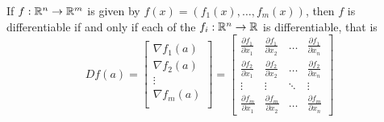 \documentclass[11pt]{article}
\begin{document}
\begin{proposition}
  \label{the jacobian matrix}
  If $f:\mathbb{R}^n \to \mathbb{R}^m$ is given by $f(x) = (f_1(x), \dots, f_m(x))$, then $f$ is differentiable if and only if each of the $f_i:\mathbb{R}^n\to \mathbb{R}$ is differentiable, that is
  \[
    Df(a) =
      \begin{bmatrix}
        \nabla f_1(a)\\
        \nabla f_2(a)\\
        \vdots\\
        \nabla f_m(a)\\
      \end{bmatrix}
      =
      \begin{bmatrix}
        \frac{\partial f_1}{\partial x_1} & \frac{\partial f_1}{\partial x_2} & \dots  & \frac{\partial f_1}{\partial x_n} \\
        \frac{\partial f_2}{\partial x_1} & \frac{\partial f_2}{\partial x_2} & \dots  & \frac{\partial f_2}{\partial x_n} \\
        \vdots & \vdots & \ddots & \vdots \\
        \frac{\partial f_m}{\partial x_1} & \frac{\partial f_m}{\partial x_2} & \dots  & \frac{\partial f_m}{\partial x_n}
      \end{bmatrix}
  \]
\end{proposition}
\end{document}
